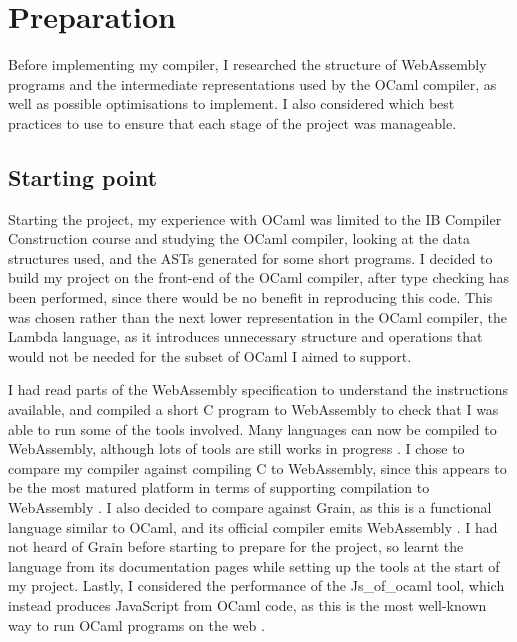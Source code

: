 \chapter{Preparation} %


Before implementing my compiler, I researched the structure of WebAssembly programs and the intermediate representations used by the OCaml compiler, as well as possible optimisations to implement. I also considered which best practices to use to ensure that each stage of the project was manageable. %

\section{Starting point}
Starting the project, my experience with OCaml was limited to the IB Compiler Construction course and studying the OCaml compiler, looking at the data structures used, and the ASTs generated for some short programs. I decided to build my project on the front-end of the OCaml compiler, after type checking has been performed, since there would be no benefit in reproducing this code. This was chosen rather than the next lower representation in the OCaml compiler, the Lambda language, as it introduces unnecessary structure and operations that would not be needed for the subset of OCaml I aimed to support. 

I had read parts of the WebAssembly specification to understand the instructions available, and compiled a short C program to WebAssembly to check that I was able to run some of the tools involved.
Many languages can now be compiled to WebAssembly, although lots of tools are still works in progress \cite{langauges-to-wasm}. I chose to compare my compiler against compiling C to WebAssembly, since this appears to be the most matured platform in terms of supporting compilation to WebAssembly \cite{clang-llvm}. I also decided to compare against Grain, as this is a functional language similar to OCaml, and its official compiler emits WebAssembly \cite{grain}. I had not heard of Grain before starting to prepare for the project, so learnt the language from its documentation pages while setting up the tools at the start of my project. Lastly, I considered the performance of the Js\_of\_ocaml tool, which instead produces JavaScript from OCaml code, as this is the most well-known way to run OCaml programs on the web \cite{jsofocaml}.

